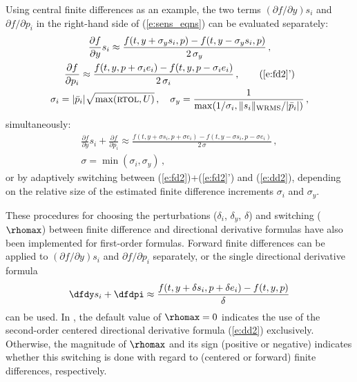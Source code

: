 Using central finite differences as an example, the two terms 
$({\partial f}/{\partial y}) s_i$ 
and ${\partial f}/{\partial p_i}$ in the right-hand side of (\ref{e:sens_eqns}) 
can be evaluated separately:
\begin{gather}
  \frac{\partial f}{\partial y} s_i \approx \frac{f(t, y+\sigma_y s_i, p)-
    f(t, y-\sigma_y s_i, p)}{2\,\sigma_y} \, , \label{e:fd2} \\
  \frac{\partial f}{\partial p_i} \approx \frac{f(t,y,p + \sigma_i e_i)-
    f(t,y,p - \sigma_i e_i)}{2\,\sigma_i} \, , \tag{\ref{e:fd2}'} \\
  \sigma_i = |{\bar p}_i| \sqrt{\max( \mbox{\sc rtol} , U)} \, , \quad
  \sigma_y = \frac{1}{\max(1/\sigma_i, \|s_i\|_{\mbox{\scriptsize WRMS}}/|{\bar p}_i|)} \, , \nonumber
\end{gather}
simultaneously:
\begin{gather}
  \frac{\partial f}{\partial y} s_i + \frac{\partial f}{\partial p_i} \approx
  \frac{f(t, y+\sigma s_i, p + \sigma e_i) -
    f(t, y-\sigma s_i, p - \sigma e_i)}{2\,\sigma} \, , \label{e:dd2} \\
  \sigma = \min(\sigma_i, \sigma_y) \, , \nonumber
\end{gather}
or by adaptively switching between (\ref{e:fd2})+(\ref{e:fd2}') and (\ref{e:dd2}), 
depending on the relative size of the estimated finite difference 
increments $\sigma_i$ and $\sigma_y$.

These procedures for choosing the perturbations ($\delta_i$,
$\delta_y$, $\delta$) and switching ($\rhomax$) between
finite difference and directional derivative formulas have also been implemented 
for first-order formulas.
Forward finite differences can be applied to $({\partial f}/{\partial y}) s_i$ and
${\partial f}/{\partial p_i}$ separately, or the single directional derivative formula
\begin{equation*}
\dfdy s_i + \dfdpi \approx
\frac{f(t, y+\delta s_i, p + \delta e_i) - f(t, y, p)}{\delta}
\end{equation*}
can be used.
In {\cvodes}, the default value of $\rhomax=0$ indicates the use of
the second-order centered directional derivative formula (\ref{e:dd2}) exclusively.
Otherwise, the magnitude of $\rhomax$ and its sign (positive or
negative) indicates whether this switching is done with regard to
(centered or forward) finite differences, respectively.

